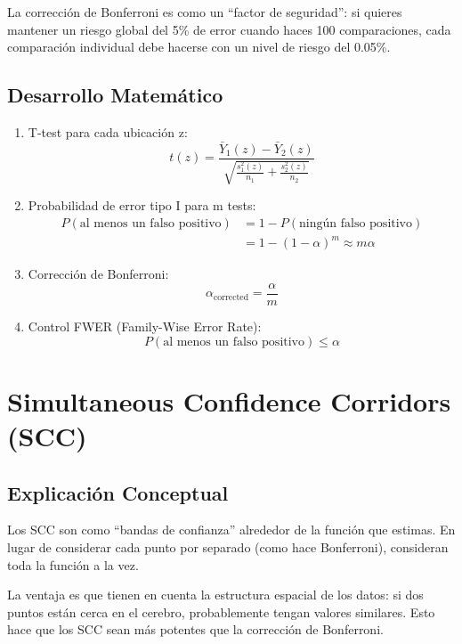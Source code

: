 \documentclass[12pt,a4paper]{article}
\begin{document}
La corrección de Bonferroni es como un ``factor de seguridad'': si quieres mantener un riesgo global del 5\% de error cuando haces 100 comparaciones, cada comparación individual debe hacerse con un nivel de riesgo del 0.05\%.

\subsection{Desarrollo Matemático}
\begin{enumerate}
\item T-test para cada ubicación z:
  \begin{equation}
  t(z) = \frac{\bar{Y}_1(z) - \bar{Y}_2(z)}{\sqrt{\frac{s_1^2(z)}{n_1} + \frac{s_2^2(z)}{n_2}}}
  \end{equation}

\item Probabilidad de error tipo I para m tests:
  \begin{align}
  P(\text{al menos un falso positivo}) &= 1 - P(\text{ningún falso positivo}) \\
  &= 1 - (1-\alpha)^m \approx m\alpha
  \end{align}

\item Corrección de Bonferroni:
  \begin{equation}
  \alpha_{\text{corrected}} = \frac{\alpha}{m}
  \end{equation}

\item Control FWER (Family-Wise Error Rate):
  \begin{equation}
  P(\text{al menos un falso positivo}) \leq \alpha
  \end{equation}
\end{enumerate}

\section{Simultaneous Confidence Corridors (SCC)}

\subsection{Explicación Conceptual}
Los SCC son como ``bandas de confianza'' alrededor de la función que estimas. En lugar de considerar cada punto por separado (como hace Bonferroni), consideran toda la función a la vez.

La ventaja es que tienen en cuenta la estructura espacial de los datos: si dos puntos están cerca en el cerebro, probablemente tengan valores similares. Esto hace que los SCC sean más potentes que la corrección de Bonferroni.
\end{document}
